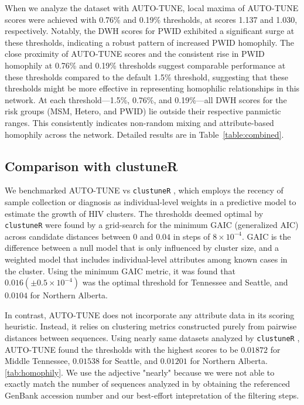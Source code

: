 \documentclass[utf8]{FrontiersinHarvard} %
\begin{document}
When we analyze the dataset with AUTO-TUNE, local maxima of AUTO-TUNE scores
were achieved with 0.76\% and 0.19\% thresholds, at scores 1.137 and 1.030,
respectively. Notably, the DWH scores for PWID exhibited a significant surge at
these thresholds, indicating a robust pattern of increased PWID homophily. The
close proximity of AUTO-TUNE scores and the consistent rise in PWID homophily
at 0.76\% and 0.19\% thresholds suggest comparable performance at these
thresholds compared to the default 1.5\% threshold, suggesting that these
thresholds might be more effective in representing homophilic relationships in
this network. At each threshold—1.5\%, 0.76\%, and 0.19\%—all DWH scores for
the risk groups (MSM, Hetero, and PWID) lie outside their respective panmictic
ranges. This consistently indicates non-random mixing and attribute-based
homophily across the network. Detailed results are in
Table~\ref{table:combined}.

\subsection{Comparison with clustuneR}

We benchmarked AUTO-TUNE vs {\tt clustuneR} \cite{chato_public_2020}, which
employs the recency of sample collection or diagnosis as individual-level
weights in a predictive model to estimate the growth of HIV clusters. The
thresholds deemed optimal by {\tt clustuneR} were found by a grid-search for
the minimum GAIC (generalized AIC) across candidate distances between $0$ and
$0.04$ in steps of $8 \times 10^{-4}$. GAIC is the difference between a null
model that is only influenced by cluster size, and a weighted model that
includes individual-level attributes among known cases in the cluster. Using
the minimum GAIC metric, it was found that $0.016 (\pm 0.5\times 10^{-4})$ was
the optimal threshold for Tennessee and Seattle, and $0.0104$ for Northern
Alberta.

In contrast, AUTO-TUNE does not incorporate any attribute data in its scoring
heuristic. Instead, it relies on clustering metrics constructed purely from
pairwise distances between sequences. Using nearly same datasets analyzed by
	{\tt clustuneR} \citep{chato_public_2020}, AUTO-TUNE found the thresholds with
the highest scores to be $0.01872$ for Middle Tennessee, $0.01538$ for Seattle,
and $0.01201$ for Northern Alberta. \autoref{tab:homophily}. We use the
adjective "nearly" because we were not able to exactly match the number of
sequences analyzed in \citet{chato_public_2020} by obtaining the referenced
GenBank accession number and our best-effort intepretation of the filtering
steps.
\end{document}
